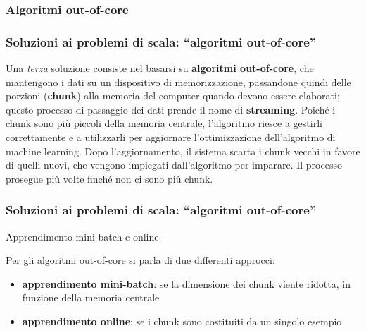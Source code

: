 \subsubsection[Algoritmi out-of-core]{Algoritmi out-of-core}
\begin{frame}
	
	\frametitle{Soluzioni ai problemi di scala: {\color{GradientDescentDiagramGreen}``algoritmi out-of-core''}}	
		Una \textit{terza} soluzione consiste nel basarsi su \textbf{algoritmi out-of-core}, che mantengono i dati su un dispositivo di memorizzazione, passandone quindi delle porzioni (\textbf{chunk}) alla memoria del computer quando devono essere elaborati; questo processo di passaggio dei dati prende il nome di \textbf{streaming}.
		\newlinedouble
		Poiché i chunk sono più piccoli della memoria centrale, l’algoritmo riesce a gestirli correttamente e a utilizzarli per aggiornare l’ottimizzazione dell’algoritmo di machine learning. Dopo l’aggiornamento, il sistema scarta i chunk vecchi in favore di quelli nuovi, che vengono impiegati dall’algoritmo per imparare. Il processo prosegue più volte finché non ci sono più chunk.

\end{frame}


\begin{frame}
	
	\frametitle{Soluzioni ai problemi di scala: {\color{GradientDescentDiagramGreen}``algoritmi out-of-core''}}	
	\begin{block}{Apprendimento mini-batch e online}
		
		Per gli algoritmi out-of-core si parla di due differenti approcci:
		\begin{itemize}
			\item \textbf{apprendimento mini-batch}: se la dimensione dei chunk viente ridotta, in funzione della memoria centrale
			\item \textbf{apprendimento online}: se i chunk sono costituiti da un singolo esempio
		\end{itemize}
	\end{block}

\end{frame}